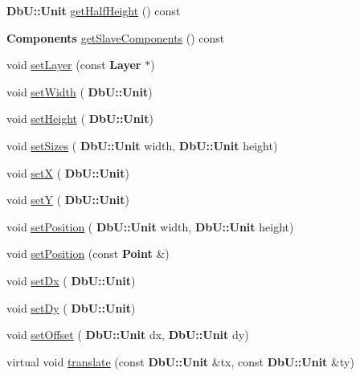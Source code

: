 \begin{DoxyCompactItemize}
\item 
\textbf{ Db\+U\+::\+Unit} \mbox{\hyperlink{classKatabatic_1_1AutoContact_a3ab7b800879862100636b003a5d168f3}{get\+Half\+Height}} () const
\item 
\textbf{ Components} \mbox{\hyperlink{classKatabatic_1_1AutoContact_ad59f45aaefd5acc8fb9795d4c0e49a7f}{get\+Slave\+Components}} () const
\item 
void \mbox{\hyperlink{classKatabatic_1_1AutoContact_aad4271c35e0162c8a4d034dca07f5a4b}{set\+Layer}} (const \textbf{ Layer} $\ast$)
\item 
void \mbox{\hyperlink{classKatabatic_1_1AutoContact_a9a0ec0a0ac85f23cfad6c069ea8dade7}{set\+Width}} (\textbf{ Db\+U\+::\+Unit})
\item 
void \mbox{\hyperlink{classKatabatic_1_1AutoContact_a106f372cee0916ebb6544627e47bb58d}{set\+Height}} (\textbf{ Db\+U\+::\+Unit})
\item 
void \mbox{\hyperlink{classKatabatic_1_1AutoContact_a0284fcec9bd41b26648e7bef3d4f1952}{set\+Sizes}} (\textbf{ Db\+U\+::\+Unit} width, \textbf{ Db\+U\+::\+Unit} height)
\item 
void \mbox{\hyperlink{classKatabatic_1_1AutoContact_a154f993d0262c92bfc0dc95154faf794}{setX}} (\textbf{ Db\+U\+::\+Unit})
\item 
void \mbox{\hyperlink{classKatabatic_1_1AutoContact_ac862ce450a533f0544d2168b132ba165}{setY}} (\textbf{ Db\+U\+::\+Unit})
\item 
void \mbox{\hyperlink{classKatabatic_1_1AutoContact_a12d3bfdce07580db21b17cf87f912cc3}{set\+Position}} (\textbf{ Db\+U\+::\+Unit} width, \textbf{ Db\+U\+::\+Unit} height)
\item 
void \mbox{\hyperlink{classKatabatic_1_1AutoContact_a52707afec84391e898e01c75b2713d32}{set\+Position}} (const \textbf{ Point} \&)
\item 
void \mbox{\hyperlink{classKatabatic_1_1AutoContact_a2c83ac6a03bbac090a8ab120d62c6e44}{set\+Dx}} (\textbf{ Db\+U\+::\+Unit})
\item 
void \mbox{\hyperlink{classKatabatic_1_1AutoContact_a123478e15e2544598851d0e907212841}{set\+Dy}} (\textbf{ Db\+U\+::\+Unit})
\item 
void \mbox{\hyperlink{classKatabatic_1_1AutoContact_a9881d5e969669b641c5de4f4d94e5d15}{set\+Offset}} (\textbf{ Db\+U\+::\+Unit} dx, \textbf{ Db\+U\+::\+Unit} dy)
\item 
virtual void \mbox{\hyperlink{classKatabatic_1_1AutoContact_a9161f1e2832e5e141a13863223322aa5}{translate}} (const \textbf{ Db\+U\+::\+Unit} \&tx, const \textbf{ Db\+U\+::\+Unit} \&ty)

\end{DoxyCompactItemize}
